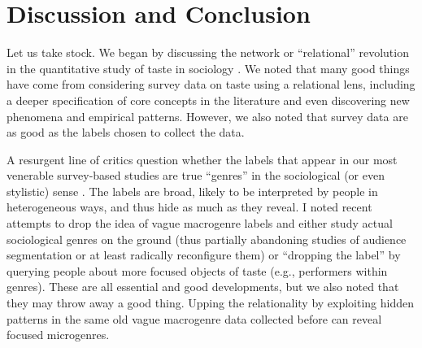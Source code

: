 \documentclass[a4paper,12pt]{extarticle}
\begin{document}
\section{Discussion and Conclusion}
Let us take stock. We began by discussing the network or ``relational'' revolution in the quantitative study of taste in sociology \citep{pachucki2010cultural, vlegels2017music, lizardo14}. We noted that many good things have come from considering survey data on taste using a relational lens, including a deeper specification of core concepts in the literature and even discovering new phenomena and empirical patterns. However, we also noted that survey data are as good as the labels chosen to collect the data. 

A resurgent line of critics question whether the labels that appear in our most venerable survey-based studies are true ``genres'' in the sociological (or even stylistic) sense \citep{lena2015relational, vlegels2015music}. The labels are broad, likely to be interpreted by people in heterogeneous ways, and thus hide as much as they reveal. I noted recent attempts to drop the idea of vague macrogenre labels and either study actual sociological genres on the ground (thus partially abandoning studies of audience segmentation or at least radically reconfigure them) or ``dropping the label'' \citep{sonnett2016ambivalence} by querying people about more focused objects of taste (e.g., performers within genres). These are all essential and good developments, but we also noted that they may throw away a good thing. Upping the relationality by exploiting hidden patterns in the same old vague macrogenre data collected before can reveal focused microgenres. 
\end{document}
